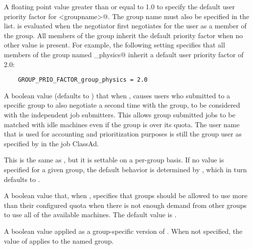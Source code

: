 \begin{description}
\label{param:GroupPrioFactorGroupname}
\item[\Macro{GROUP\_PRIO\_FACTOR\_<groupname>}]
  A floating point value greater than or equal to 1.0 to specify the
  default user priority factor for \verb@<groupname>@. 
  The group name must also be specified in the  list.
   is evaluated when
  the negotiator first negotiates for the user as a member of the group.
  All members of the group inherit the default priority factor
  when no other value is present.
  For example, the following setting
  specifies that all members of the group named \verb@group_physics@
  inherit a default user priority factor of 2.0:
  \begin{verbatim}
    GROUP_PRIO_FACTOR_group_physics = 2.0
  \end{verbatim}

\label{param:GroupAutoregroup}
\item[\Macro{GROUP\_AUTOREGROUP}]
  A boolean value (defaults to ) that when ,
  causes users who submitted to a specific group to
  also negotiate a second time with the  group,
  to be considered with the independent job submitters. 
  This allows group submitted jobs to be matched with idle machines
  even if the group is over its quota.  The user name that is
  used for accounting and prioritization purposes is still
  the group user as specified by 
  in the job ClassAd.

\label{param:GroupAutoregroupGroupname}
\item[\Macro{GROUP\_AUTOREGROUP\_<groupname>}]
  This is the same as , but it is settable
  on a per-group basis.  If no value is specified for a given group,
  the default behavior is determined by ,
  which in turn defaults to .

\label{param:GroupAcceptSurplus}
\item[\Macro{GROUP\_ACCEPT\_SURPLUS}]
  A boolean value that, when , specifies that groups should be 
  allowed to use more than their configured quota when there is not enough 
  demand from other groups to use all of the available machines.
  The default value is . 

\label{param:GroupAcceptSurplusGroupname}
\item[\Macro{GROUP\_ACCEPT\_SURPLUS\_<groupname>}]
  A boolean value applied as a group-specific version of 
  .
  When not specified, the value of  applies
  to the named group.


\end{description}
